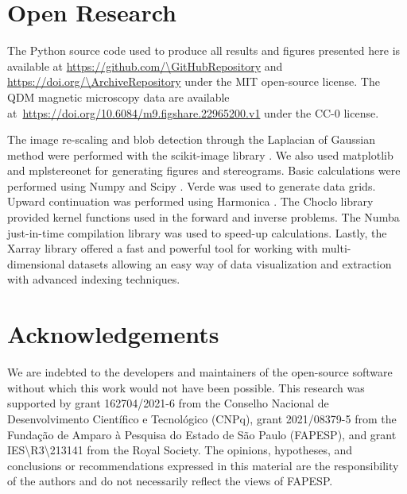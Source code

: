 \section*{Open Research}

The Python source code used to produce all results and figures presented here
is available at \url{https://github.com/\GitHubRepository} and
\url{https://doi.org/\ArchiveRepository} under the MIT open-source license.
The QDM magnetic microscopy data are available
at~\url{https://doi.org/10.6084/m9.figshare.22965200.v1} under the CC-0 license.

The image re-scaling and blob detection through the Laplacian of Gaussian
method were performed with the scikit-image library \citep{VanderWalt2014}.
We also used matplotlib \citep{Hunter2007} and mplstereonet \citep{mplstereonet}
for generating figures and stereograms.
Basic calculations were performed using Numpy \citep{Harris2020} and Scipy
\citep{2020SciPy-NMeth}.
Verde \citep{verde2018} was used to generate data grids.
Upward continuation was performed using Harmonica \citep{harmonica2020}.
The Choclo library \citep{choclo2022} provided kernel functions used in the
forward and inverse problems.
The Numba just-in-time compilation library \citep{lam2015numba} was used to
speed-up calculations.
Lastly, the Xarray library \citep{hoyer2017xarray} offered a fast and powerful
tool for working with multi-dimensional datasets allowing an easy way of data
visualization and extraction with advanced indexing techniques.


\section*{Acknowledgements}

We are indebted to the developers and maintainers of the open-source software
without which this work would not have been possible.
This research was supported by
grant 162704/2021-6 from the Conselho Nacional de Desenvolvimento Científico e Tecnológico (CNPq),
grant 2021/08379-5 from the Fundação de Amparo à Pesquisa do Estado de São Paulo (FAPESP),
and grant IES\textbackslash{}R3\textbackslash{}213141 from the Royal Society.
The opinions, hypotheses, and conclusions or recommendations expressed in this
material are the responsibility of the authors and do not necessarily reflect
the views of FAPESP.
